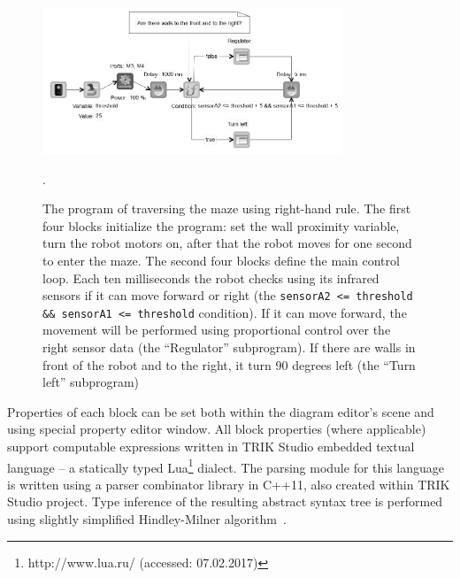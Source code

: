 \documentclass[conference]{IEEEtran}
\begin{document}
\begin{figure}[ht]
    \centering
    \includegraphics[width=0.8\textwidth]{TS_CF_Labyrinth_Diagram.png}
    \caption{The program of traversing the maze using right-hand rule. The first four blocks initialize the program: set the wall proximity variable, turn the robot motors on, after that the robot moves for one second to enter the maze. The second four blocks define the main control loop. Each ten milliseconds the robot checks using its infrared sensors if it can move forward or right (the \texttt{sensorA2 <= threshold \&\& sensorA1 <= threshold} condition). If it can move forward, the movement will be performed using proportional control over the right sensor data (the ``Regulator'' subprogram). If there are walls in front of the robot and to the right, it turn 90 degrees left (the ``Turn left'' subprogram)}.
    \label{image:TS_CF_Example}
\end{figure}

Properties of each block can be set both within the diagram editor's scene and using special property editor window. All block properties (where applicable) support computable expressions written in TRIK Studio embedded textual language -- a statically typed Lua\footnote{http://www.lua.ru/ (accessed: 07.02.2017)} dialect. The parsing module for this language is written using a parser combinator library in C++11, also created within TRIK Studio project. Type inference of the resulting abstract syntax tree is performed using slightly simplified Hindley-Milner algorithm~\cite{damas1982principal}.
\end{document}
